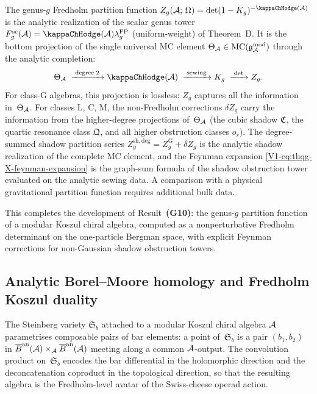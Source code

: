 \begin{remark}%
%
The genus-$g$ Fredholm partition function
$Z_g(\cA;\,\Omega) = \det(1 - \sewker_g)^{-\kappaChHodge(\cA)}$
is the analytic realization of the scalar genus tower
$F_g^{\mathrm{sc}}(\cA)=\kappaChHodge(\cA)\lambda_g^{\mathrm{FP}}$
\textup{(}uniform-weight\textup{)}
of Theorem~D. It is the bottom projection of the single
universal MC element
$\Theta_{\mathcal{A}} \in \mathrm{MC}(\mathfrak{g}_{\mathcal{A}}^{\mathrm{mod}})$
through the analytic completion:
\[
\Theta_\cA
\;\xrightarrow{\;\mathrm{degree}\;2\;}
\kappaChHodge(\cA)
\;\xrightarrow{\;\mathrm{sewing}\;}
\sewker_g
\;\xrightarrow{\;\det\;}
Z_g.
\]
For class-G algebras, this projection is lossless: $Z_g$
captures all the information in~$\Theta_{\mathcal{A}}$. For classes
L, C, M, the non-Fredholm corrections $\delta Z_g$ carry the
information from the higher-degree projections of~$\Theta_{\mathcal{A}}$
(the cubic shadow $\mathfrak{C}$, the quartic resonance class
$\mathfrak{Q}$, and all higher obstruction classes $o_r$).
The degree-summed shadow partition series
$Z_g^{\mathrm{sh,deg}} = Z_g^{\mathrm{G}} + \delta Z_g$
is the analytic shadow realization of the complete MC element, and
the Feynman expansion \eqref{V1-eq:thqg-X-feynman-expansion}
is the graph-sum formula of the shadow obstruction tower
evaluated on the analytic sewing data. A comparison with a physical
gravitational partition function requires additional bulk data.

This completes the development of Result~\textbf{(G10)}: the
genus-$g$ partition function of a modular Koszul chiral algebra,
computed as a nonperturbative Fredholm determinant on the
one-particle Bergman space, with explicit Feynman corrections
for non-Gaussian shadow obstruction towers.
\end{remark}


\subsection{Analytic Borel--Moore homology and Fredholm Koszul duality}

\providecommand{\fSb}{\mathfrak{S}_b}

The Steinberg variety $\fSb$ attached to a modular Koszul chiral
algebra $\mathcal{A}$ parametrises composable pairs of bar elements:
a point of~$\fSb$ is a pair $(b_1, b_2)$ in
$\overline{B}^{\mathrm{an}}(\mathcal{A}) \times_{\mathcal{A}} \overline{B}^{\mathrm{an}}(\mathcal{A})$ meeting along a common
$\mathcal{A}$-output. The convolution product on~$\fSb$ encodes
the bar differential in the holomorphic direction and the
deconcatenation coproduct in the topological direction,
so that the resulting algebra is the Fredholm-level avatar
of the Swiss-cheese operad action.

